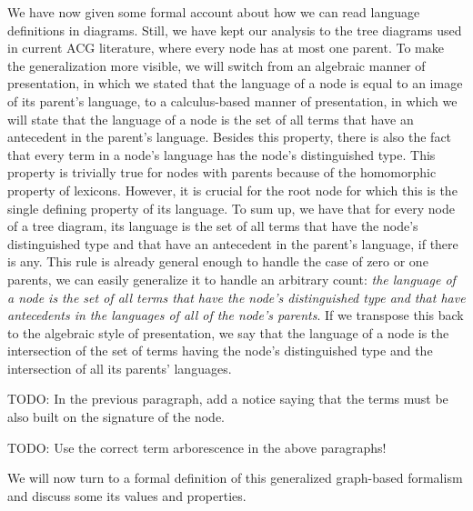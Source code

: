 We have now given some formal account about how we can read language
definitions in diagrams. Still, we have kept our analysis to the tree
diagrams used in current ACG literature, where every node has at most
one parent. To make the generalization more visible, we will switch from
an algebraic manner of presentation, in which we stated that the
language of a node is equal to an image of its parent's language, to a
calculus-based manner of presentation, in which we will state that the
language of a node is the set of all terms that have an antecedent in
the parent's language. Besides this property, there is also the fact
that every term in a node's language has the node's distinguished
type. This property is trivially true for nodes with parents because of
the homomorphic property of lexicons. However, it is crucial for the
root node for which this is the single defining property of its
language. To sum up, we have that for every node of a tree diagram, its
language is the set of all terms that have the node's distinguished type
and that have an antecedent in the parent's language, if there is
any. This rule is already general enough to handle the case of zero or
one parents, we can easily generalize it to handle an arbitrary count:
\emph{the language of a node is the set of all terms that have the
  node's distinguished type and that have antecedents in the languages
  of all of the node's parents}. If we transpose this back to the
algebraic style of presentation, we say that the language of a node is
the intersection of the set of terms having the node's distinguished
type and the intersection of all its parents' languages.

TODO: In the previous paragraph, add a notice saying that the terms must
be also built on the signature of the node.

TODO: Use the correct term arborescence in the above paragraphs!

We will now turn to a formal definition of this generalized graph-based
formalism and discuss some its values and properties.
